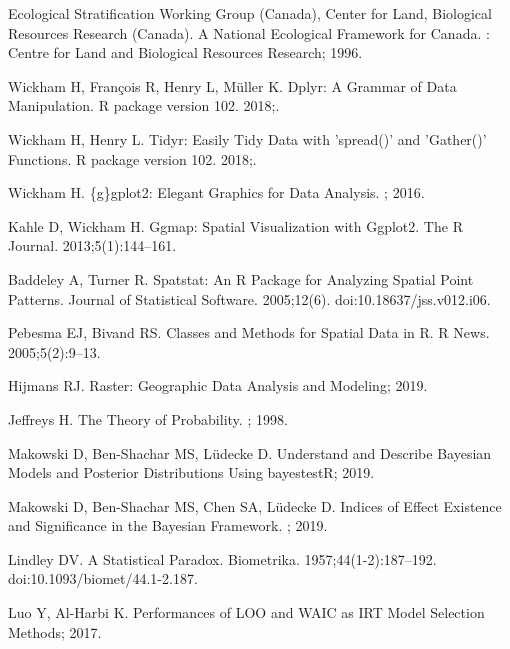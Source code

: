 \documentclass[10pt,letterpaper]{article}
\begin{document}
\begin{thebibliography}{10}
{Ecological Stratification Working Group (Canada)}, {Center for Land,
  Biological Resources Research (Canada)}.
\newblock A National Ecological Framework for {{Canada}}.
: {Centre for Land and Biological Resources Research};
  1996.

Wickham H, Fran{\c c}ois R, Henry L, M{\"u}ller K.
\newblock Dplyr: {{A Grammar}} of {{Data Manipulation}}.
\newblock R package version 102. 2018;.

Wickham H, Henry L.
\newblock Tidyr: {{Easily Tidy Data}} with 'spread()' and 'Gather()'
  {{Functions}}.
\newblock R package version 102. 2018;.

Wickham H.
\newblock \{g\}gplot2: {{Elegant Graphics}} for {{Data Analysis}}.
; 2016.

Kahle D, Wickham H.
\newblock Ggmap: {{Spatial Visualization}} with Ggplot2.
\newblock The R Journal. 2013;5(1):144--161.

Baddeley A, Turner R.
\newblock Spatstat: {{An R Package}} for {{Analyzing Spatial Point Patterns}}.
\newblock Journal of Statistical Software. 2005;12(6).
\newblock doi:{10.18637/jss.v012.i06}.

Pebesma EJ, Bivand RS.
\newblock Classes and Methods for Spatial Data in {{R}}.
\newblock R News. 2005;5(2):9--13.

Hijmans RJ.
\newblock Raster: Geographic Data Analysis and Modeling; 2019.

Jeffreys H.
\newblock The {{Theory}} of {{Probability}}.
; 1998.

Makowski D, {Ben-Shachar} MS, L{\"u}decke D. Understand and {{Describe Bayesian
  Models}} and {{Posterior Distributions}} Using {{bayestestR}}; 2019.

Makowski D, {Ben-Shachar} MS, Chen SA, L{\"u}decke D.
\newblock Indices of {{Effect Existence}} and {{Significance}} in the
  {{Bayesian Framework}}.
; 2019.

Lindley DV.
\newblock A {{Statistical Paradox}}.
\newblock Biometrika. 1957;44(1-2):187--192.
\newblock doi:{10.1093/biomet/44.1-2.187}.

Luo Y, {Al-Harbi} K.
\newblock Performances of {{LOO}} and {{WAIC}} as {{IRT Model Selection
  Methods}}; 2017.

\end{thebibliography}
\end{document}
